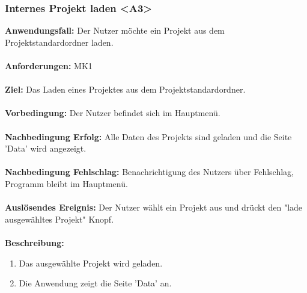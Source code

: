 \documentclass[parskip=full]{scrartcl} %
\begin{document}
\subsubsection*{Internes Projekt laden <A3>}
\textbf{Anwendungsfall:} Der Nutzer möchte ein Projekt aus dem Projektstandardordner laden.\\\\
\textbf{Anforderungen:} MK1 \\\\
\textbf{Ziel:} Das Laden eines Projektes aus dem Projektstandardordner. \\\\
\textbf{Vorbedingung:} Der Nutzer befindet sich im Hauptmenü.  \\\\
\textbf{Nachbedingung Erfolg:} Alle Daten des Projekts sind geladen und die Seite 'Data' wird angezeigt. \\\\
\textbf{Nachbedingung Fehlschlag:} Benachrichtigung des Nutzers über Fehlschlag, Programm  bleibt im Hauptmenü. \\\\
\textbf{Auslösendes Ereignis:}  Der Nutzer wählt ein Projekt aus und drückt den "lade ausgewähltes Projekt" Knopf. \\\\
\textbf{Beschreibung:}
\begin{enumerate}
    \item Das ausgewählte Projekt wird geladen.
    \item Die Anwendung zeigt die Seite 'Data' an.
\end{enumerate}
\newpage
\end{document}
